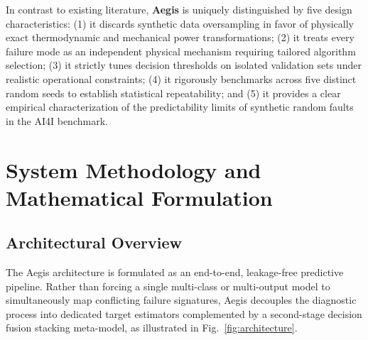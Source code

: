 \documentclass[conference]{IEEEtran}
\begin{document}
In contrast to existing literature, \textbf{Aegis} is uniquely distinguished by five design characteristics: (1) it discards synthetic data oversampling in favor of physically exact thermodynamic and mechanical power transformations; (2) it treats every failure mode as an independent physical mechanism requiring tailored algorithm selection; (3) it strictly tunes decision thresholds on isolated validation sets under realistic operational constraints; (4) it rigorously benchmarks across five distinct random seeds to establish statistical repeatability; and (5) it provides a clear empirical characterization of the predictability limits of synthetic random faults in the AI4I benchmark.

\section{System Methodology and Mathematical Formulation}

\subsection{Architectural Overview}
The Aegis architecture is formulated as an end-to-end, leakage-free predictive pipeline. Rather than forcing a single multi-class or multi-output model to simultaneously map conflicting failure signatures, Aegis decouples the diagnostic process into dedicated target estimators complemented by a second-stage decision fusion stacking meta-model, as illustrated in Fig.~\ref{fig:architecture}.
\end{document}
